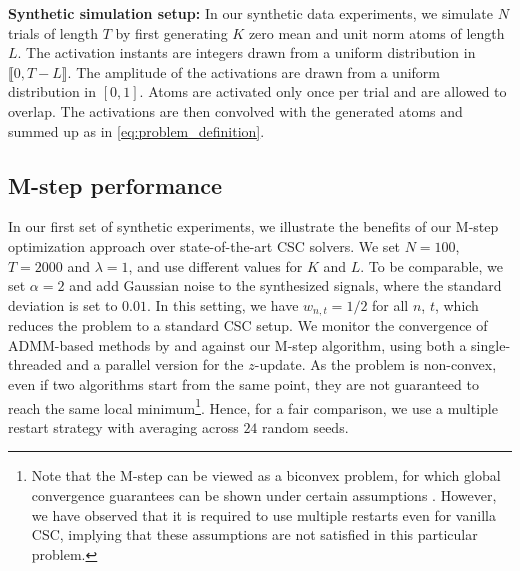 \textbf{Synthetic simulation setup:} 
In our synthetic data experiments, we simulate $N$ trials of length $T$ by first generating $K$ zero mean and unit norm atoms of length $L$. The  activation instants are integers drawn from a uniform distribution in $\llbracket0, T-L \rrbracket$. The amplitude of the activations are drawn from a uniform distribution in $[0, 1]$. Atoms are activated only once per trial and are allowed to overlap. The activations are then convolved with the generated atoms and summed up as in \eqref{eq:problem_definition}. 


\subsection{M-step performance} 
\label{sec:m-step-performance}
In our first set of synthetic experiments, we illustrate the benefits of our M-step optimization approach over state-of-the-art CSC solvers. 
%
%
We set $N=100$, $T=2000$ and $\lambda=1$, and use different values for $K$ and $L$. To be comparable, we set $\alpha=2$ and add Gaussian noise to the synthesized signals, where the standard deviation is set to $0.01$. In this setting, we  have $w_{n,t}=1/2$ for all $n$, $t$, which reduces the problem to a standard CSC setup. We monitor the convergence of ADMM-based methods by \citet{heide2015fast} and \citet{wohlberg2016efficient} against our M-step algorithm, using both a single-threaded and a parallel version for the $z$-update. 
As the problem is non-convex, even if two algorithms start from the same point, they are not guaranteed to reach the same local minimum\footnote{Note that the M-step can be viewed as a biconvex problem, for which global convergence guarantees can be shown under certain assumptions \citep{agarwal2014learning, gorski2007biconvex}. However, we have observed that it is required to use multiple restarts even for vanilla CSC, implying that these assumptions are not satisfied in this particular problem.}. 
%
Hence, for a fair comparison, we use a multiple restart strategy with averaging across $24$ random seeds.




